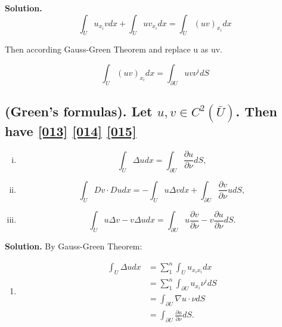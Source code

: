 \documentclass[a4paper]{book}
\newenvironment{solution}%
{\noindent\textbf{Solution.}}%
{\qedhere}
\numberwithin{equation}{chapter}
\theoremstyle{definition}
\begin{document}
\begin{multicols}{2}
\begin{solution}
	\begin{equation}
		\int_U u_{x_i} v dx + \int_U uv_{x_i} dx = \int_U  (uv)_{x_i} dx 
	\end{equation}
	
	Then according Gauss-Green Theorem and replace u as uv.
	
	\begin{equation}
		\int_U  (uv)_{x_i} dx = \int_{\partial U} uv \nu^i dS
	\end{equation}
\end{solution}


\subsection{(Green's formulas). Let $u,v \in C^2(\bar{U})$. Then  have \ref{013} \ref{014} \ref{015}}
\begin{enumerate}[(i)]
	\item \begin{equation}\label{013}
		\int_U \Delta u dx = \int_{\partial U} \frac{\partial u}{\partial \nu} dS,
	\end{equation}
	
	\item \begin{equation}\label{014}
		\int_U Dv \cdot Du dx = - \int_U u \Delta v dx + \int_{\partial U } \frac{\partial v}{\partial \nu} u dS,
	\end{equation}
	\item \begin{equation}\label{015}
		\int_U u \Delta v - v \Delta u dx = \int_{\partial U} u \frac{\partial v}{\partial \nu} - v \frac{\partial u}{\partial \nu} dS.
	\end{equation}
\end{enumerate}

\begin{solution}
	By Gauss-Green Theorem:
	\begin{enumerate}[i]
		\item \begin{equation}\nonumber
		\begin{aligned}
		\int_U \Delta u dx &= \sum_{1}^{n} \int_U u_{x_i x_i} dx\\
		& = \sum_{1}^{n} \int_{\partial U} u_{x_i}\nu^i dS\\
		& = \int_{\partial U} \nabla u \cdot \nu dS\\
		& = \int_{\partial U} \frac{\partial u}{\partial \nu} dS.
		\end{aligned}
		\end{equation}
		

\end{enumerate}
\end{solution}
\end{multicols}
\end{document}
